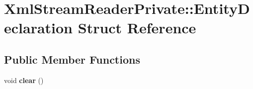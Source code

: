 \hypertarget{struct_xml_stream_reader_private_1_1_entity_declaration}{}\section{Xml\+Stream\+Reader\+Private\+:\+:Entity\+Declaration Struct Reference}
\label{struct_xml_stream_reader_private_1_1_entity_declaration}
\subsection*{Public Member Functions}
\begin{DoxyCompactItemize}
\item 
\mbox{\label{struct_xml_stream_reader_private_1_1_entity_declaration_a9294ff8913dcb278e8bc6afdab268ef2}} 
void {\bfseries clear} ()
\end{DoxyCompactItemize}
